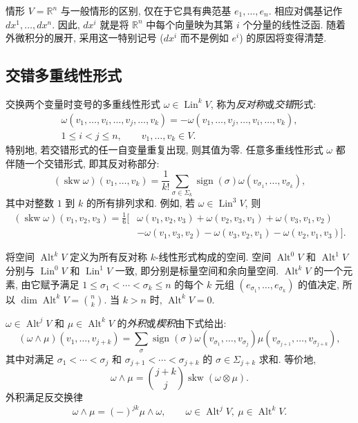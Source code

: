 {情形 $V=\mathbb R^n$ 与一般情形的区别, 仅在于它具有典范基 $e_1,\ldots,e_n$. 相应对偶基记作 $dx^1,\ldots,dx^n$. 因此, $dx^i$ 就是将 $\mathbb R^n$ 中每个向量映为其第 $i$ 个分量的线性泛函. 随着外微积分的展开, 采用这一特别记号 ($dx^i$ 而不是例如 $e^i$) 的原因将变得清楚.}

\subsection{{交错多重线性形式}}\label{subsec:alternating-multilinear-forms}

{交换两个变量时变号的多重线性形式 $\omega\in\operatorname{Lin}^kV$, 称为\emph{反对称}或\emph{交错}形式:}
\[
\begin{gathered}
\omega(v_1,\ldots,v_i,\ldots,v_j,\ldots,v_k)=-\omega(v_1,\ldots,v_j,\ldots,v_i,\ldots,v_k),\\
1\leq i<j\leq n,\qquad v_1,\ldots,v_k\in V.
\end{gathered}
\]
{特别地, 若交错形式的任一自变量重复出现, 则其值为零. 任意多重线性形式 $\omega$ 都伴随一个交错形式, 即其反对称部分:}
\[
(\operatorname{skw}\omega)(v_1,\ldots,v_k)=\frac1{k!}\sum_{\sigma\in\Sigma_k}\operatorname{sign}(\sigma)\omega(v_{\sigma_1},\ldots,v_{\sigma_k}),
\]
{其中对整数 $1$ 到 $k$ 的所有排列求和. 例如, 若 $\omega\in\operatorname{Lin}^3V$, 则}
\[
\begin{aligned}
(\operatorname{skw}\omega)(v_1,v_2,v_3)=\frac16[&\omega(v_1,v_2,v_3)+\omega(v_2,v_3,v_1)+\omega(v_3,v_1,v_2)\\
&-\omega(v_1,v_3,v_2)-\omega(v_3,v_2,v_1)-\omega(v_2,v_1,v_3)].
\end{aligned}
\]

{将空间 $\operatorname{Alt}^kV$ 定义为所有反对称 $k$-线性形式构成的空间. 空间 $\operatorname{Alt}^0V$ 和 $\operatorname{Alt}^1V$ 分别与 $\operatorname{Lin}^0V$ 和 $\operatorname{Lin}^1V$ 一致, 即分别是标量空间和余向量空间. $\operatorname{Alt}^kV$ 的一个元素, 由它赋予满足 $1\leq\sigma_1<\cdots<\sigma_k\leq n$ 的每个 $k$ 元组 $(e_{\sigma_1},\ldots,e_{\sigma_k})$ 的值决定, 所以 $\dim\operatorname{Alt}^kV=\binom nk$. 当 $k>n$ 时, $\operatorname{Alt}^kV=0$.}

{$\omega\in\operatorname{Alt}^jV$ 和 $\mu\in\operatorname{Alt}^kV$ 的\emph{外积}或\emph{楔积}由下式给出:}
\[
(\omega\wedge\mu)(v_1,\ldots,v_{j+k})=\sum_\sigma\operatorname{sign}(\sigma)\omega(v_{\sigma_1},\ldots,v_{\sigma_j})\mu(v_{\sigma_{j+1}},\ldots,v_{\sigma_{j+k}}),
\]
{其中对满足 $\sigma_1<\cdots<\sigma_j$ 和 $\sigma_{j+1}<\cdots<\sigma_{j+k}$ 的 $\sigma\in\Sigma_{j+k}$ 求和. 等价地,}
\[
\omega\wedge\mu=\binom{j+k}j\operatorname{skw}(\omega\otimes\mu).
\]
{外积满足反交换律}
\[
\omega\wedge\mu=(-)^{jk}\mu\wedge\omega,\qquad\omega\in\operatorname{Alt}^jV,\ \mu\in\operatorname{Alt}^kV.
\]

